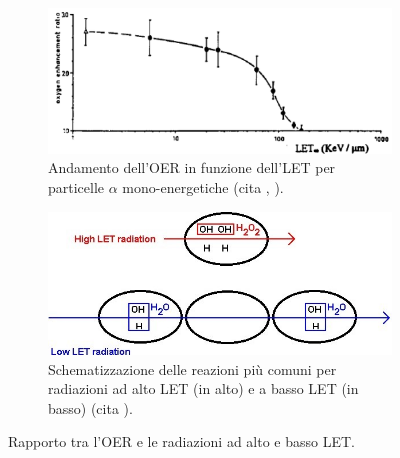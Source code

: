 \documentclass[12pt,a4paper,twoside]{report}
\begin{document}
	\begin{figure}[H]
		\centering
		\begin{subfigure}[t]{0.49\textwidth}
			\centering
			\includegraphics[width=\textwidth, scale=0.50]{let_rbe2.png}
			\caption{Andamento dell'OER in funzione dell'LET per particelle $\alpha$ mono-energetiche (cita
				,
				).}
			\label{fig:let_oer}
		\end{subfigure}
		\hfill
		\begin{subfigure}[t]{0.49\textwidth}
			\centering
			\includegraphics[width=\textwidth, scale=0.50]{reaction_let.jpg}
			\caption{Schematizzazione delle reazioni più comuni per radiazioni ad alto LET (in alto) e a basso LET (in basso) (cita
				).}
			\label{fig:reaction_let}
		\end{subfigure}
		\caption{Rapporto tra l'OER e le radiazioni ad alto e basso LET.}
	\end{figure}
		
\end{document}
